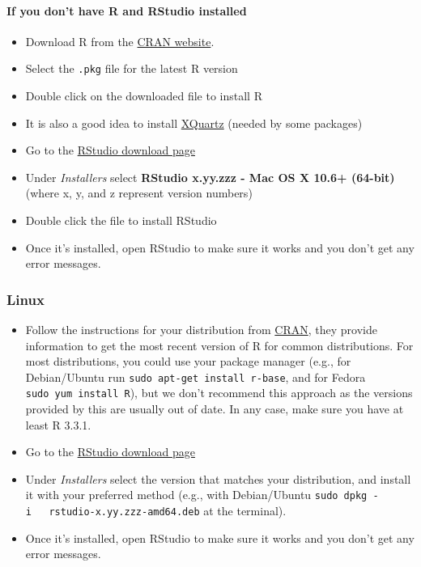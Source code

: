 \documentclass[]{book}
\providecommand{\tightlist}{%
  \setlength{\itemsep}{0pt}\setlength{\parskip}{0pt}}
\let\oldparagraph\paragraph
\renewcommand{\paragraph}[1]{\oldparagraph{#1}\mbox{}}
\begin{document}
\paragraph{If you don't have R and RStudio
installed}\label{if-you-dont-have-r-and-rstudio-installed-1}

\begin{itemize}
\tightlist
\item
  Download R from the \href{http://cran.r-project.org/bin/macosx/}{CRAN
  website}.
\item
  Select the \texttt{.pkg} file for the latest R version
\item
  Double click on the downloaded file to install R
\item
  It is also a good idea to install
  \href{https://www.xquartz.org/}{XQuartz} (needed by some packages)
\item
  Go to the
  \href{https://www.rstudio.com/products/rstudio/download/\#download}{RStudio
  download page}
\item
  Under \emph{Installers} select \textbf{RStudio x.yy.zzz - Mac OS X
  10.6+ (64-bit)} (where x, y, and z represent version numbers)
\item
  Double click the file to install RStudio
\item
  Once it's installed, open RStudio to make sure it works and you don't
  get any error messages.
\end{itemize}

\subsubsection{Linux}\label{linux}

\begin{itemize}
\tightlist
\item
  Follow the instructions for your distribution from
  \href{https://cloud.r-project.org/bin/linux}{CRAN}, they provide
  information to get the most recent version of R for common
  distributions. For most distributions, you could use your package
  manager (e.g., for Debian/Ubuntu run
  \texttt{sudo\ apt-get\ install\ r-base}, and for Fedora
  \texttt{sudo\ yum\ install\ R}), but we don't recommend this approach
  as the versions provided by this are usually out of date. In any case,
  make sure you have at least R 3.3.1.
\item
  Go to the
  \href{https://www.rstudio.com/products/rstudio/download/\#download}{RStudio
  download page}
\item
  Under \emph{Installers} select the version that matches your
  distribution, and install it with your preferred method (e.g., with
  Debian/Ubuntu \texttt{sudo\ dpkg\ -i\ \ \ rstudio-x.yy.zzz-amd64.deb}
  at the terminal).
\item
  Once it's installed, open RStudio to make sure it works and you don't
  get any error messages.
\end{itemize}
\end{document}

